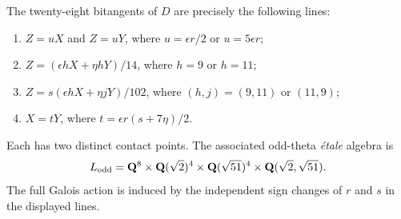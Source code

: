 \begin{theorem}
\label{thm:theta-lines}
The twenty-eight bitangents of $D$ are precisely the following lines:
\begin{enumerate}
\item $Z=uX$ and $Z=uY$, where $u=\epsilon r/2$ or $u=5\epsilon r$;
\item $Z=(\epsilon hX+\eta hY)/14$, where $h=9$ or $h=11$;
\item $Z=s(\epsilon hX+\eta jY)/102$, where
      $(h,j)=(9,11)$ or $(11,9)$;
\item $X=tY$, where $t=\epsilon r(s+7\eta)/2$.
\end{enumerate}
Each has two distinct contact points.  The associated odd-theta
\emph{\'etale} algebra is
\begin{equation}
 L_{\mathrm{odd}}
 =\mathbf Q^8\times\mathbf Q(\sqrt2)^4\times\mathbf Q(\sqrt{51})^4
          \times\mathbf Q(\sqrt2,\sqrt{51}).
 \label{eq:theta-algebra}
\end{equation}
The full Galois action is induced by the independent sign changes of $r$
and $s$ in the displayed lines.
\end{theorem}

